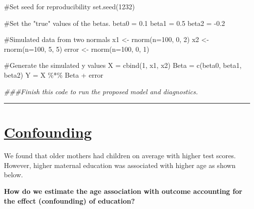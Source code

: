 \documentclass[
  letterpaper,
  DIV=11,
  numbers=noendperiod]{scrreprt}
\newenvironment{Shaded}{\begin{snugshade}}{\end{snugshade}}
\newcommand{\AttributeTok}[1]{\textcolor[rgb]{0.40,0.45,0.13}{#1}}
\newcommand{\CommentTok}[1]{\textcolor[rgb]{0.37,0.37,0.37}{#1}}
\newcommand{\DecValTok}[1]{\textcolor[rgb]{0.68,0.00,0.00}{#1}}
\newcommand{\DocumentationTok}[1]{\textcolor[rgb]{0.37,0.37,0.37}{\textit{#1}}}
\newcommand{\FloatTok}[1]{\textcolor[rgb]{0.68,0.00,0.00}{#1}}
\newcommand{\FunctionTok}[1]{\textcolor[rgb]{0.28,0.35,0.67}{#1}}
\newcommand{\NormalTok}[1]{\textcolor[rgb]{0.00,0.23,0.31}{#1}}
\newcommand{\OtherTok}[1]{\textcolor[rgb]{0.00,0.23,0.31}{#1}}
\newcommand{\SpecialCharTok}[1]{\textcolor[rgb]{0.37,0.37,0.37}{#1}}
\begin{document}
\begin{Shaded}
\begin{Highlighting}[]
\CommentTok{\#Set seed for reproducibility}
\FunctionTok{set.seed}\NormalTok{(}\DecValTok{1232}\NormalTok{)}

\CommentTok{\#Set the "true" values of the betas.}
\NormalTok{beta0 }\OtherTok{=} \FloatTok{0.1}
\NormalTok{beta1 }\OtherTok{=} \FloatTok{0.5}
\NormalTok{beta2 }\OtherTok{=} \SpecialCharTok{{-}}\FloatTok{0.2}

\CommentTok{\#Simulated data from two normals}
\NormalTok{x1 }\OtherTok{\textless{}{-}} \FunctionTok{rnorm}\NormalTok{(}\AttributeTok{n=}\DecValTok{100}\NormalTok{, }\DecValTok{0}\NormalTok{, }\DecValTok{2}\NormalTok{)}
\NormalTok{x2 }\OtherTok{\textless{}{-}} \FunctionTok{rnorm}\NormalTok{(}\AttributeTok{n=}\DecValTok{100}\NormalTok{, }\DecValTok{5}\NormalTok{, }\DecValTok{5}\NormalTok{)}
\NormalTok{error }\OtherTok{\textless{}{-}} \FunctionTok{rnorm}\NormalTok{(}\AttributeTok{n=}\DecValTok{100}\NormalTok{, }\DecValTok{0}\NormalTok{, }\DecValTok{1}\NormalTok{)}

\CommentTok{\#Generate the simulated y values}
\NormalTok{X }\OtherTok{=} \FunctionTok{cbind}\NormalTok{(}\DecValTok{1}\NormalTok{, x1, x2)}
\NormalTok{Beta }\OtherTok{=} \FunctionTok{c}\NormalTok{(beta0, beta1, beta2)}
\NormalTok{Y }\OtherTok{=}\NormalTok{ X }\SpecialCharTok{\%*\%}\NormalTok{ Beta }\SpecialCharTok{+}\NormalTok{ error}

\DocumentationTok{\#\#\#Finish this code to run the proposed model and diagnostics.}
\end{Highlighting}
\end{Shaded}

\begin{center}\rule{0.5\linewidth}{0.5pt}\end{center}

\hypertarget{confounding}{%
\section*{\texorpdfstring{\ul{Confounding}}{Confounding}}\label{confounding}}


We found that older mothers had children on average with higher test
scores. However, higher maternal education was associated with higher
age as shown below.

\textbf{How do we estimate the age association with outcome accounting
for the effect (confounding) of education?}
\end{document}

